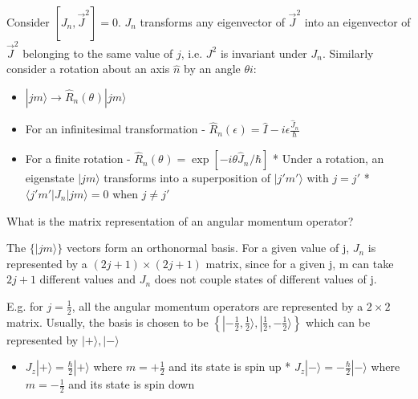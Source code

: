 \documentclass[a4paper,11pt,normalem]{article}
\begin{document}
Consider \([J_n,\vec{J}^2] = 0\). \(J_n\) transforms any eigenvector of
\(\vec{J}^2\) into an eigenvector of \(\vec{J}^2\) belonging to the same
value of \(j\), i.e. \(J^2\) is invariant under \(J_n\). 
Similarly consider a rotation about an axis \(\hat{n}\) by an angle \(\theta i\):
\begin{itemize}
    \item \(|jm\rangle \to \hat{R}_n(\theta_{})|jm\rangle\) 
    \item For an infinitesimal transformation - \(\hat{R}_n(\epsilon_{}) = \hat{I} - i\epsilon\frac{\hat{J}_n}{\hbar_{}}\)
    \item For a finite rotation - \(\hat{R}_n(\theta_{}) = \exp[-i\theta\hat{J}_{n_{}}/\hbar]\) * Under a rotation, an eigenstate \(|jm\rangle\) transforms into a superposition of \(|j'm'\rangle\) with \(j=j'\) * \(\langle j'm'|J_n|jm\rangle = 0\) when \(j \neq j'\)
\end{itemize}

What is the matrix representation of an angular momentum operator?

The \(\{|jm\rangle\}\) vectors form an orthonormal basis. For a given
value of j, \(J_n\) is represented by a \((2j+1)\times(2j+1)\) matrix,
since for a given j, m can take \(2j + 1\) different values and \(J_n\)
does not couple states of different values of j.

E.g. for \(j = \frac{1}{2}\), all the angular momentum operators are
represented by a \(2\times 2\) matrix. Usually, the basis is chosen to
be
\(\left\{|-\frac{1}{2},\frac{1}{2}\rangle,|\frac{1}{2},-\frac{1}{2}\rangle\right\}\)
which can be represented by \(|+\rangle,|-\rangle\)
\begin{itemize}
    \item \(J_z|+\rangle = \frac{\hbar}{2}|+\rangle\) where \(m = +\frac{1}{2}\)
and its state is spin up * \(J_z|-\rangle = -\frac{\hbar}{2}|-\rangle\)
where \(m = -\frac{1}{2}\) and its state is spin down
\end{itemize}
\end{document}
